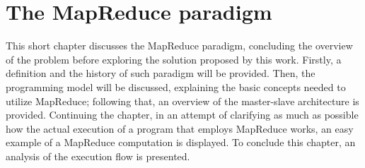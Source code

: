 \chapter{The MapReduce paradigm}
This short chapter discusses the MapReduce paradigm, concluding the overview of the problem before exploring the solution proposed by this work. Firstly, a definition and the history of such paradigm will be provided. Then, the programming model will be discussed, explaining the basic concepts needed to utilize MapReduce; following that, an overview of the master-slave architecture is provided. Continuing the chapter, in an attempt of clarifying as much as possible how the actual execution of a program that employs MapReduce works, an easy example of a MapReduce computation is displayed. To conclude this chapter, an analysis of the execution flow is presented.





